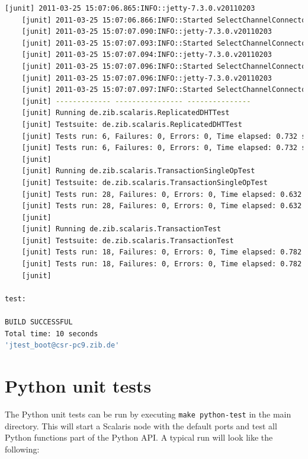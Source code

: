 \documentclass[a4paper]{scrreprt}
\newcommand{\code}[1]{\lstinline[basicstyle=\ttfamily]!#1!}
\begin{document}
\begin{lstlisting}[language=sh]
    [junit] 2011-03-25 15:07:06.865:INFO::jetty-7.3.0.v20110203
    [junit] 2011-03-25 15:07:06.866:INFO::Started SelectChannelConnector@127.0.0.1:53886
    [junit] 2011-03-25 15:07:07.090:INFO::jetty-7.3.0.v20110203
    [junit] 2011-03-25 15:07:07.093:INFO::Started SelectChannelConnector@127.0.0.1:33141
    [junit] 2011-03-25 15:07:07.094:INFO::jetty-7.3.0.v20110203
    [junit] 2011-03-25 15:07:07.096:INFO::Started SelectChannelConnector@127.0.0.1:39119
    [junit] 2011-03-25 15:07:07.096:INFO::jetty-7.3.0.v20110203
    [junit] 2011-03-25 15:07:07.097:INFO::Started SelectChannelConnector@127.0.0.1:41603
    [junit] ------------- ---------------- ---------------
    [junit] Running de.zib.scalaris.ReplicatedDHTTest
    [junit] Testsuite: de.zib.scalaris.ReplicatedDHTTest
    [junit] Tests run: 6, Failures: 0, Errors: 0, Time elapsed: 0.732 sec
    [junit] Tests run: 6, Failures: 0, Errors: 0, Time elapsed: 0.732 sec
    [junit] 
    [junit] Running de.zib.scalaris.TransactionSingleOpTest
    [junit] Testsuite: de.zib.scalaris.TransactionSingleOpTest
    [junit] Tests run: 28, Failures: 0, Errors: 0, Time elapsed: 0.632 sec
    [junit] Tests run: 28, Failures: 0, Errors: 0, Time elapsed: 0.632 sec
    [junit] 
    [junit] Running de.zib.scalaris.TransactionTest
    [junit] Testsuite: de.zib.scalaris.TransactionTest
    [junit] Tests run: 18, Failures: 0, Errors: 0, Time elapsed: 0.782 sec
    [junit] Tests run: 18, Failures: 0, Errors: 0, Time elapsed: 0.782 sec
    [junit] 

test:

BUILD SUCCESSFUL
Total time: 10 seconds
'jtest_boot@csr-pc9.zib.de'
\end{lstlisting}

\section{Python unit tests}
The Python unit tests can be run by executing \code{make python-test} in the
main directory. This will start a Scalaris node with the default ports and test
all Python functions part of the Python API. A typical run will look like the
following:
\end{document}
